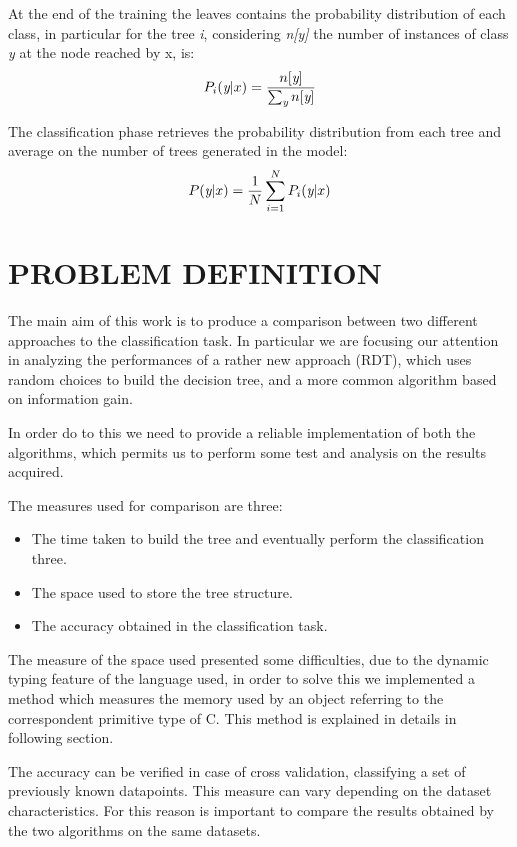 \documentclass{acm_proc_article-sp-sigmod07}
\begin{document}
At the end of the training the leaves contains the probability distribution
of each class, in particular for the tree \emph{i}, considering
\emph{n[y]} the number of instances of class \emph{y} at the node reached
by x, is:
\begin{equation}
\label{formula:probability_tree}
	P_i(\emph{y}|x) = \frac{n[\emph{y}]}{\sum_\emph{y} n[\emph{y}]}
\end{equation}

The classification phase retrieves the probability distribution from each
tree and average on the number of trees generated in the model:
\begin{equation}
\label{formula:probability_forest}
	P(\emph{y}|x) = \frac{1}{N} \sum_{i=1}^N P_i(\emph{y}|x)
\end{equation}


\section{PROBLEM DEFINITION}
The main aim of this work is to produce a comparison between two different
approaches to the classification task. In particular we are focusing our
attention in analyzing the performances of a rather new approach (RDT),
which uses random choices to build the decision tree, and a more common
algorithm based on information gain.

In order do to this we need to provide a reliable implementation of both
the algorithms, which permits us to perform some test and analysis on the
results acquired.

The measures used for comparison are three:
\begin{itemize}
\item The time taken to build the tree and eventually perform the
classification three.
\item The space used to store the tree structure.
\item The accuracy obtained in the classification task.
\end{itemize}

The measure of the space used presented some difficulties, due to the
dynamic typing feature of the language used, in order to solve this we
implemented a method which measures the memory used by an object referring
to the correspondent primitive type of C. This method is explained in
details in following section.

The accuracy can be verified in case of cross validation, classifying a
set of previously known datapoints. This measure can vary depending on the
dataset characteristics. For this reason is important to compare the
results obtained by the two algorithms on the same datasets.
\end{document}

